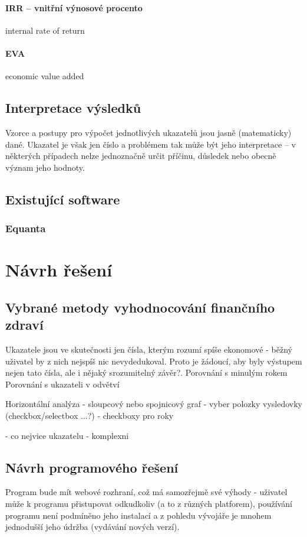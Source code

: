 \subsubsection{IRR -- vnitřní výnosové procento}
internal rate of return

\subsubsection{EVA}
economic value added



\section{Interpretace výsledků}
Vzorce a postupy pro výpočet jednotlivých ukazatelů jsou jasně (matematicky) dané. Ukazatel je však jen číslo a problémem tak může být jeho interpretace -- v některých případech nelze jednoznačně určit příčinu, důsledek nebo obecně význam jeho hodnoty. 

\section{Existující software}
\subsection{Equanta\sffamily\textregistered}

\chapter{Návrh řešení}
\section{Vybrané metody vyhodnocování finančního zdraví}
Ukazatele jsou ve skutečnosti jen čísla, kterým rozumí spíše ekonomové - běžný uživatel by z nich nejspíš nic nevydedukoval. Proto je žádoucí, aby byly výstupem nejen tato čísla, ale i nějaký srozumitelný závěr?.
Porovnání s minulým rokem
Porovnání s ukazateli v odvětví

Horizontální analýza
- sloupcový nebo spojnicový graf
- vyber polozky vysledovky (checkbox/selectbox ...?)
- checkboxy pro roky

- co nejvice ukazatelu - komplexni

\section{Návrh programového řešení}
Program bude mít webové rozhraní, což má samozřejmě své výhody - uživatel může k programu přistupovat odkudkoliv (a to z různých platforem), používání programu není podmíněno jeho instalací a z pohledu vývojáře je mnohem jednodušší jeho údržba (vydávání nových verzí).

